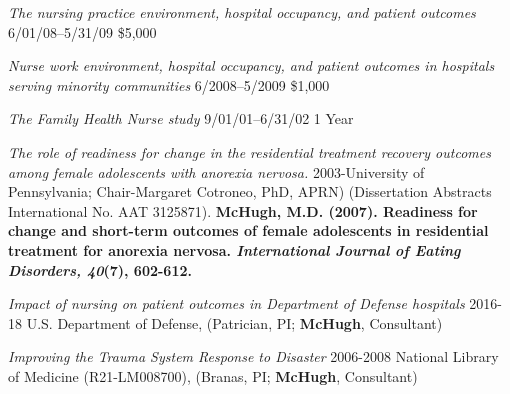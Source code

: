 \documentclass[10pt,]{article}
\begin{document}
{{{{{{{{{{{{{{\textit {The nursing practice environment, hospital occupancy, and patient outcomes} \hfill 6/01/08--5/31/09 \newline
{}	\hfill \$5,000

\textit {Nurse work environment, hospital occupancy, and patient outcomes in hospitals serving minority communities} \hfill 6/2008--5/2009 \newline
{}	\hfill \$1,000

\textit {The Family Health Nurse study} \hfill 9/01/01--6/31/02 \newline
{} \hfill 1 Year


\vspace{4mm}


{\textit {The role of readiness for change in the residential treatment recovery outcomes among female adolescents with anorexia nervosa.}} 
2003-University of Pennsylvania; Chair-Margaret Cotroneo, PhD, APRN) (Dissertation Abstracts International No. AAT 3125871). {\textbf {\small {McHugh, M.D. (2007). Readiness for change and short-term outcomes of female adolescents in residential treatment for anorexia nervosa. {\textit {International Journal of Eating Disorders, 40}}(7), 602-612.}}}

\vspace{4mm}


{\textit {Impact of nursing on patient outcomes in Department of Defense hospitals}} \hfill 2016-18 \newline
\hspace*{0.5cm}U.S. Department of Defense, (Patrician, PI; {\textbf {McHugh}}, Consultant)

{\textit {Improving the Trauma System Response to Disaster}} \hfill 2006-2008 \newline
\hspace*{0.5cm}National Library of Medicine (R21-LM008700), (Branas, PI; {\textbf {McHugh}}, Consultant)

}}}}}}}}}}}}}}
\end{document}

